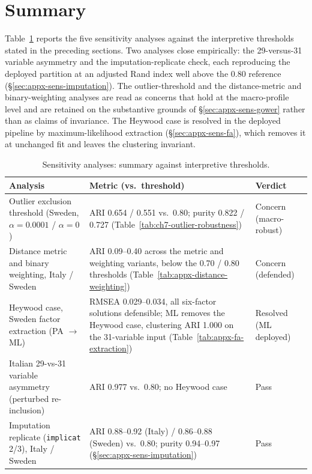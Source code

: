 \section{Summary}
\label{sec:appx-sens-summary}

Table~\ref{tab:appx-sens-summary} reports the five sensitivity analyses against the interpretive thresholds stated in the preceding sections. Two analyses close empirically: the 29-versus-31 variable asymmetry and the imputation-replicate check, each reproducing the deployed partition at an adjusted Rand index well above the 0.80 reference (\S\ref{sec:appx-sens-imputation}). The outlier-threshold and the distance-metric and binary-weighting analyses are read as concerns that hold at the macro-profile level and are retained on the substantive grounds of \S\ref{sec:appx-sens-gower} rather than as claims of invariance. The Heywood case is resolved in the deployed pipeline by maximum-likelihood extraction (\S\ref{sec:appx-sens-fa}), which removes it at unchanged fit and leaves the clustering invariant.

{\setlength{\intextsep}{2pt}\setlength{\textfloatsep}{2pt}%
\begin{table}[H]
\centering
\setlength{\abovecaptionskip}{3pt}\setlength{\belowcaptionskip}{2pt}
\caption[Sensitivity analyses: summary against interpretive thresholds]{Sensitivity analyses: summary against interpretive thresholds.}
\label{tab:appx-sens-summary}
\footnotesize
\renewcommand{\arraystretch}{0.85}
\setlength{\tabcolsep}{4pt}
\begin{tabularx}{\textwidth}{@{}>{\raggedright\arraybackslash}p{} >{\raggedright\arraybackslash}X >{\raggedright\arraybackslash}p{}@{}}
\toprule
\textbf{Analysis} & \textbf{Metric (vs.\ threshold)} & \textbf{Verdict} \\
\midrule
Outlier exclusion threshold (Sweden, $\alpha = 0.0001$ / $\alpha = 0$) &
ARI 0.654 / 0.551 vs.\ 0.80; purity 0.822 / 0.727 (Table~\ref{tab:ch7-outlier-robustness}) &
Concern (macro-robust) \\
Distance metric and binary weighting, Italy / Sweden &
ARI 0.09--0.40 across the metric and weighting variants, below the 0.70 / 0.80 thresholds (Table~\ref{tab:appx-distance-weighting}) &
Concern (defended) \\
Heywood case, Sweden factor extraction (PA $\to$ ML) &
RMSEA 0.029--0.034, all six-factor solutions defensible; ML removes the Heywood case, clustering ARI 1.000 on the 31-variable input (Table~\ref{tab:appx-fa-extraction}) &
Resolved (ML deployed) \\
Italian 29-vs-31 variable asymmetry (perturbed re-inclusion) &
ARI 0.977 vs.\ 0.80; no Heywood case &
Pass \\
Imputation replicate (\texttt{implicat} 2/3), Italy / Sweden &
ARI 0.88--0.92 (Italy) / 0.86--0.88 (Sweden) vs.\ 0.80; purity 0.94--0.97 (\S\ref{sec:appx-sens-imputation}) &
Pass \\
\bottomrule
\end{tabularx}
\end{table}}

